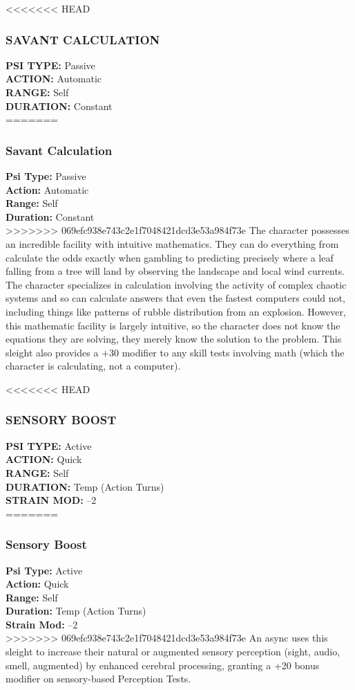 <<<<<<< HEAD \subsubsection{SAVANT CALCULATION} \textbf{PSI TYPE:} Passive \\ \textbf{ACTION:} Automatic \\ \textbf{RANGE:} Self \\ \textbf{DURATION:} Constant \\ ======= \subsubsection{Savant Calculation} \textbf{Psi Type:} Passive \\ \textbf{Action:} Automatic \\ \textbf{Range:} Self \\ \textbf{Duration:} Constant \\ >>>>>>> 069efc938e743c2e1f7048421dcd3e53a984f73e The character possesses an incredible facility with intuitive mathematics. They can do everything from calculate the odds exactly when gambling to predicting precisely where a leaf falling from a tree will land by observing the landscape and local wind currents. The character specializes in calculation involving the activity of complex chaotic systems and so can calculate answers that even the fastest computers could not, including things like patterns of rubble distribution from an explosion. However, this mathematic facility is largely intuitive, so the character does not know the equations they are solving, they merely know the solution to the problem. This sleight also provides a +30 modifier to any skill tests involving math (which the character is calculating, not a computer). 

<<<<<<< HEAD \subsubsection{SENSORY BOOST} \textbf{PSI TYPE:} Active \\ \textbf{ACTION:} Quick \\ \textbf{RANGE:} Self \\ \textbf{DURATION:} Temp (Action Turns) \\ \textbf{STRAIN MOD:} –2 \\ ======= \subsubsection{Sensory Boost} \textbf{Psi Type:} Active \\ \textbf{Action:} Quick \\ \textbf{Range:} Self \\ \textbf{Duration:} Temp (Action Turns) \\ \textbf{Strain Mod:} –2 \\ >>>>>>> 069efc938e743c2e1f7048421dcd3e53a984f73e An async uses this sleight to increase their natural or augmented sensory perception (sight, audio, smell, augmented) by enhanced cerebral processing, granting a +20 bonus modifier on sensory-based Perception Tests. 

